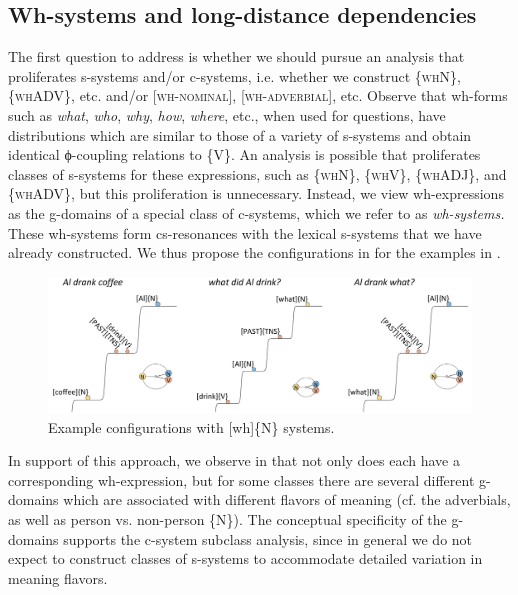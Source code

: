 \subsection{Wh-systems and long-distance dependencies}

The first question to address is whether we should pursue an analysis that proliferates s-systems and/or c-systems, i.e. whether we construct \{\textsc{whN}\}, \{\textsc{whADV}\}, etc. and/or [\textsc{wh-nominal}], [\textsc{wh-adverbial}], etc. Observe that wh-forms such as \textit{what}, \textit{who}, \textit{why}, \textit{how}, \textit{where}, etc., when used for questions, have distributions which are similar to those of a variety of s-systems and obtain identical ϕ-coupling relations to \{V\}. An analysis is possible that proliferates classes of s-systems for these expressions, such as \{\textsc{whN}\}, \{\textsc{whV}\}, \{\textsc{whADJ}\}, and \{\textsc{whADV}\}, but this proliferation is unnecessary. Instead, we view wh-expressions as the g-domains of a special class of c-systems, which we refer to as \textit{wh-systems.} These wh-systems form cs-resonances with the lexical s-systems that we have already constructed. We thus propose the configurations in {} for the examples in .

  
\begin{figure}
\includegraphics[width=\textwidth]{figures/Tilsen-img158.png}
\caption{Example configurations with [wh]\{N\} systems.}
\label{fig:7:14}
\end{figure}
 

  In support of this approach, we observe in {} that not only does each  have a corresponding wh-expression, but for some  classes there are several different g-domains which are associated with different flavors of meaning (cf. the adverbials, as well as person vs. non-person \{N\}). The conceptual specificity of the g-domains supports the c-system subclass analysis, since in general we do not expect to construct classes of s-systems to accommodate detailed variation in meaning flavors.

